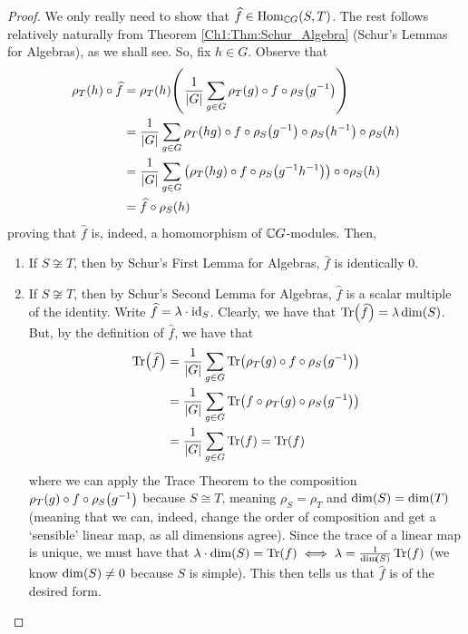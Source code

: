 \begin{proof}
    We only really need to show that $\widehat{f} \in \operatorname{Hom}_{\mathbb{C} G}(S, T)$. The rest follows relatively naturally from Theorem \ref{Ch1:Thm:Schur_Algebra} (Schur's Lemmas for Algebras), as we shall see. So, fix $h \in G$. Observe that
    \begin{align*}
        \rho_T(h) \circ \widehat{f} &= \rho_T(h)\!\left( \frac{1}{\left\lvert G \right\rvert} \sum_{g \in G} \rho_T(g) \circ f \circ \rho_S\!\left( g^{-1} \right) \right) \\
        &= \frac{1}{\left\lvert G \right\rvert} \sum_{g \in G} \rho_T(hg) \circ f \circ \rho_S\!\left( g^{-1} \right) \circ \rho_S\!\left( h^{-1} \right) \circ \rho_S(h) \\
        &= \frac{1}{\left\lvert G \right\rvert} \sum_{g \in G} \left( \rho_T(hg) \circ f \circ \rho_S\!\left( g^{-1} h^{-1} \right) \right) \circ \circ \rho_S(h) \\
        &= \widehat{f} \circ \rho_S(h)
    \end{align*}
    proving that $\hat{f}$ is, indeed, a homomorphism of $\mathbb{C} G$-modules. Then,
    \begin{enumerate}
        \item If $S \not\cong T$, then by Schur's First Lemma for Algebras, $\hat{f}$ is identically $0$.
        \item If $S \not\cong T$, then by Schur's Second Lemma for Algebras, $\hat{f}$ is a scalar multiple of the identity. Write $\widehat{f} = \lambda \cdot \operatorname{id}_S$. Clearly, we have that $\operatorname{Tr}\!\left( \widehat{f} \right) = \lambda \dim\!\left( S \right)$. But, by the definition of $\hat{f}$, we have that
        \begin{align*}
            \Tr{\hat{f}} &= \frac{1}{\abs{G}} \sum_{g \in G} \Tr{\rho_T(g) \circ f \circ \rho_S\!\parenth{g\inv}} \\
            &= \frac{1}{\abs{G}} \sum_{g \in G} \Tr{f \circ \rho_T\!\parenth{g} \circ \rho_S\!\parenth{g\inv}} \\
            &= \frac{1}{\abs{G}} \sum_{g \in G} \Tr{f} = \Tr{f}
        \end{align*}
        where we can apply the Trace Theorem to the composition $\rho_T(g) \circ f \circ \rho_S\!\left( g^{-1} \right)$ because $S \cong T$, meaning $\rho_S = \rho_T$ and $\dim\!\left( S \right) = \dim\!\left( T \right)$ (meaning that we can, indeed, change the order of composition and get a `sensible' linear map, as all dimensions agree). Since the trace of a linear map is unique, we must have that $\lambda \cdot \dim\!\left( S \right) = \operatorname{Tr}\!\left( f \right) \iff \lambda = \frac{1}{\dim\!\left( S \right)} \operatorname{Tr}\!\left( f \right)$ (we know $\dim\!\left( S \right) \neq 0$ because $S$ is simple). This then tells us that $\hat{f}$ is of the desired form.
    \end{enumerate}
\end{proof}

